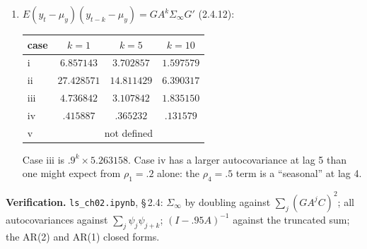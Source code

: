 \documentclass[12pt, letterpaper]{article}
\newcommand{\nb}[1]{\texttt{ls\_ch02.ipynb}, \S\,#1}
\begin{document}
\begin{tcolorbox}[evenbox,title={Exercise 2.4 \quad AR(4) with a Constant}]
\begin{enumerate}
\item $E(y_t-\mu_y)(y_{t-k}-\mu_y)=GA^k\Sigma_\infty G'$ (2.4.12):
\begin{center}\small
\begin{tabular}{@{}lccc@{}}
\toprule
case & $k=1$ & $k=5$ & $k=10$\\
\midrule
i & $6.857143$ & $3.702857$ & $1.597579$\\
ii & $27.428571$ & $14.811429$ & $6.390317$\\
iii & $4.736842$ & $3.107842$ & $1.835150$\\
iv & $.415887$ & $.365232$ & $.131579$\\
v & \multicolumn{3}{c}{not defined}\\
\bottomrule
\end{tabular}
\end{center}
Case iii is $.9^k\times5.263158$. Case iv has a larger autocovariance at lag 5 than one might expect
from $\rho_1=.2$ alone: the $\rho_4=.5$ term is a ``seasonal'' at lag 4.
\end{enumerate}

\textbf{Verification.} \nb{2.4}: $\Sigma_\infty$ by doubling against $\sum_j(GA^jC)^2$; all
autocovariances against $\sum_j\psi_j\psi_{j+k}$; $(I-.95A)^{-1}$ against the truncated sum; the AR(2)
and AR(1) closed forms. \checkmark
\end{tcolorbox}
\end{document}
